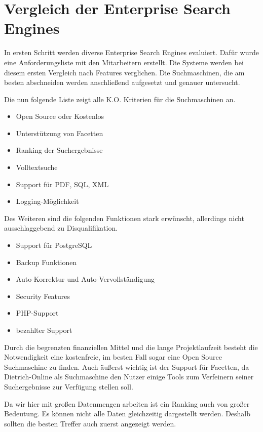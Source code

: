 \chapter{Vergleich der Enterprise Search Engines}

In ersten Schritt werden diverse Enterprise Search Engines evaluiert. Dafür wurde eine Anforderungsliste mit den Mitarbeitern erstellt. Die Systeme werden bei diesem ersten Vergleich nach Features verglichen. Die Suchmaschinen, die am besten abschneiden werden anschließend aufgesetzt und genauer untersucht.

Die nun folgende Liste zeigt alle K.O. Kriterien für die Suchmaschinen an.
\begin{itemize}
    \item Open Source oder Kostenlos
    \item Unterstützung von Facetten
    \item Ranking der Suchergebnisse
    \item Volltextsuche
    \item Support für PDF, SQL, XML
    \item Logging-Möglichkeit
\end{itemize}

Des Weiteren sind die folgenden Funktionen stark erwünscht, allerdings nicht ausschlaggebend zu Disqualifikation.

\begin{itemize}
    \item Support für PostgreSQL
    \item Backup Funktionen
    \item Auto-Korrektur und Auto-Vervollständigung
    \item Security Features
    \item PHP-Support
    \item bezahlter Support
\end{itemize}

Durch die begrenzten finanziellen Mittel und die lange Projektlaufzeit besteht die Notwendigkeit eine kostenfreie, im besten Fall sogar eine Open Source Suchmaschine zu finden. Auch äußerst wichtig ist der Support für Facetten, da Dietrich-Online als Suchmaschine den Nutzer einige Tools zum Verfeinern seiner Suchergebnisse zur Verfügung stellen soll.

Da wir hier mit großen Datenmengen arbeiten ist ein Ranking auch von großer Bedeutung. Es können nicht alle Daten gleichzeitig dargestellt werden. Deshalb sollten die besten Treffer auch zuerst angezeigt werden.

